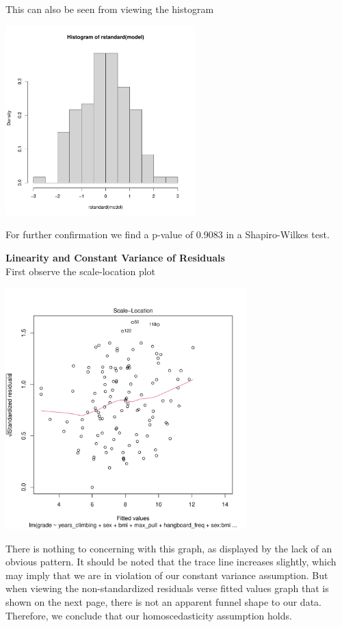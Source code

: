 \documentclass[11pt]{amsart}
\begin{document}
This can also be seen from viewing the histogram\\
\begin{center}
\includegraphics[width=0.55\textwidth]{2.pdf}
\end{center}

For further confirmation we find a p-value of 0.9083 in a Shapiro-Wilkes test.

\newpage
{\bf Linearity and Constant Variance of Residuals}\\
First observe the scale-location plot
\begin{center}
\includegraphics[width=0.7\textwidth]{4.pdf}
\end{center}
\vspace{0.15in}
There is nothing to concerning with this graph, as displayed by the lack of an obvious pattern.
It should be noted that the trace line increases slightly, which may imply that we are in violation of our constant variance assumption. But when viewing the non-standardized residuals verse fitted values graph that is shown on the next page, there is not an apparent funnel shape to our data. Therefore, we conclude that our homoscedasticity assumption holds. 
\end{document}
